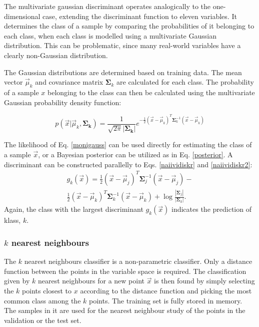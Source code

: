 \documentclass[twoside]{article}
\renewcommand{\v}[1]{\vec{#1}}
\begin{document}
\begin{multicols}{2}
The multivariate gaussian discriminant operates analogically to the one-dimensional
case, extending the discriminant function to eleven variables. It determines the class of a sample by
comparing the probabilities of it belonging to each class, when each
class is modelled using a multivariate Gaussian distribution. This can be problematic,
since many real-world variables have a clearly non-Gaussian distribution.

The Gaussian distributions are determined based on training data.
The mean vector $\v{\mu}_k$ and covariance matrix $\mathbf{\Sigma}_k$ are calculated for each class.
The probability of a sample $x$ belonging to the class can then be calculated
using the multivariate Gaussian probability density function:

\begin{equation}\label{monigauss}
 p(\v{x}|\v{\mu}_k,\mathbf{\Sigma_k}) = \frac{1}{\sqrt{2\pi} |\mathbf{\Sigma_k}|}
 e^{-\frac{1}{2}(\v{x}-\v{\mu}_k)^T \mathbf{\Sigma}_k^{-1} (\v{x}-\v{\mu}_k)}
\end{equation}

The likelihood of Eq. \eqref{monigauss} can be used directly for estimating the class of a
sample $\v{x}$, or a Bayesian posterior can be utilized as in Eq. \eqref{posterior}. 
A discriminant can be constructed parallelly to Eqs. \eqref{naiividiskr} and \eqref{naiividiskr2}:
\begin{equation}
	\begin{aligned}
	 g_k(\v{x}) = \frac{1}{2}(\v{x}-\v{\mu}_j)^T \mathbf{\Sigma}_j^{-1} (\v{x}-\v{\mu}_j) - \\
	 \frac{1}{2}(\v{x}-\v{\mu}_k)^T \mathbf{\Sigma}_k^{-1} (\v{x}-\v{\mu}_k) 
	+\log \frac{|\mathbf{\Sigma}_j|}{|\mathbf{\Sigma}_k|}.
       \end{aligned}
\end{equation}
Again, the class with the largest discriminant $g_k(\v{x})$ indicates the prediction of klass, $k$.

\subsubsection{$k$ nearest neighbours}\label{method:knn}

The $k$ nearest neighbours classifier is a non-parametric classifier. Only a
distance function between the points in the variable space is required.
The classification given by $k$ nearest neighbours for a new point $\v{x}$ is then found by simply
selecting the $k$ points closest to $x$ according to the distance function and
picking the most common class among the $k$ points. The training set is fully
stored in memory. The samples in it are used for the nearest neighbour study
of the points in the validation or the test set.


\end{multicols}
\end{document}

